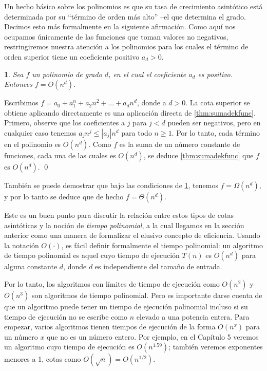 \documentclass[a4paper, 12pt]{book}
\theoremstyle{dotless}
\newtheorem{theorem}{}[section]
\renewenvironment{proof}{\vspace{12pt}{\noindent\bfseries Demostración.}}{\qed\vspace{12pt}}
\begin{document}
Un hecho básico sobre los polinomios es que su tasa de crecimiento asintótico está determinada por su ``término de orden más alto'' --el que determina el grado. Decimos esto más formalmente en la siguiente afirmación. Como aquí nos ocupamos únicamente de las funciones que toman valores no negativos, restringiremos nuestra atención a los polinomios para los cuales el término de orden superior tiene un coeficiente positivo $a_d>0$.

\begin{theorem}
\label{thm:ordendepoli}
Sea $f$ un polinomio de grado $d$, en el cual el coeficiente $a_d$ es positivo. Entonces $f = O(n^d)$.
\end{theorem}

\begin{proof}
Escribimos $f = a_0 + a_1^n + a_2n^2 + ... + a_dn^d$, donde a $d>0$. La cota superior se obtiene aplicando directamente es una aplicación directa de \ref{thm:sumadekfunc}. Primero, observe que los coeficientes a $j$ para $j<d$ pueden ser negativos, pero en cualquier caso tenemos $a_jn^j ≤ |a_j|n^d$ para todo $n≥1$. Por lo tanto, cada término en el polinomio es $O(n^d)$. Como $f$ es la suma de un número constante de funciones, cada una de las cuales es $O(n^d)$, se deduce \ref{thm:sumadekfunc} que $f$ es $O(n^d)$. 
\end{proof}

También se puede demostrar que bajo las condiciones de \ref{thm:ordendepoli}, tenemos $f=\Omega(n^d)$, y por lo tanto se deduce que de hecho $f = \Theta(n^d)$.

Este es un buen punto para discutir la relación entre estos tipos de cotas asintóticas y la noción de \textit{tiempo polinomial}, a la cual llegamos en la sección anterior como una manera de formalizar el elusivo concepto de eficiencia. Usando la notación $O(\cdot)$, es fácil definir formalmente el tiempo polinomial: un algoritmo de tiempo polinomial es aquel cuyo tiempo de ejecución $T(n)$ es $O(n^d)$ para alguna constante $d$, donde $d$ es independiente del tamaño de entrada.

Por lo tanto, los algoritmos con límites de tiempo de ejecución como $O(n^2)$ y $O(n^3)$ son algoritmos de tiempo polinomial. Pero es importante darse cuenta de que un algoritmo puede tener un tiempo de ejecución polinomial incluso si su tiempo de ejecución no se escribe como $n$ elevado a una potencia entera. Para empezar, varios algoritmos tienen tiempos de ejecución de la forma $O(n^x)$ para un número $x$ que no es un número entero. Por ejemplo, en el Capítulo 5 veremos un algoritmo cuyo tiempo de ejecución es $O(n^{1.59})$; también veremos exponentes menores a 1, cotas como $O(\sqrt{n}) = O(n^{1/2})$.
\end{document}
